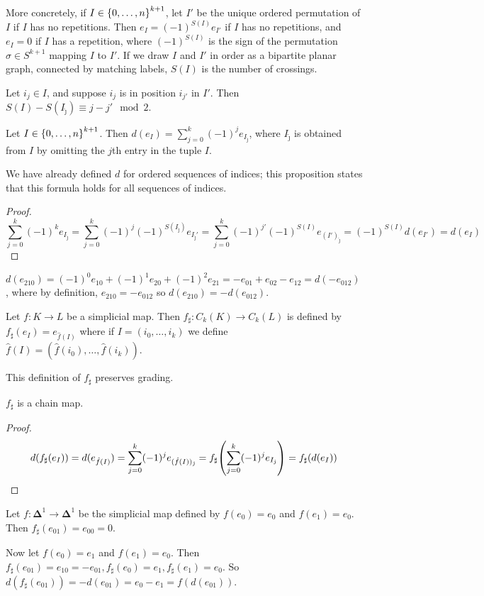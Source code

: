 More concretely, if \( I \in \qty{0, \dots, n}^{k+1} \), let \( I' \) be the unique ordered permutation of \( I \) if \( I \) has no repetitions.
Then \( e_I = (-1)^{S(I)} e_{I'} \) if \( I \) has no repetitions, and \( e_I = 0 \) if \( I \) has a repetition, where \( (-1)^{S(I)} \) is the sign of the permutation \( \sigma \in S^{k+1} \) mapping \( I \) to \( I' \).
If we draw \( I \) and \( I' \) in order as a bipartite planar graph, connected by matching labels, \( S(I) \) is the number of crossings.
\begin{lemma}
	Let \( i_j \in I \), and suppose \( i_j \) is in position \( i_{j'} \) in \( I' \).
	Then \( S(I) - S(I_{\hat\jmath}) \equiv j - j' \mod 2 \).
\end{lemma}
\begin{proposition}
	Let \( I \in \qty{0, \dots, n}^{k+1} \).
	Then \( d(e_I) = \sum_{j=0}^k (-1)^j e_{I_{\hat\jmath}} \), where \( I_{\hat\jmath} \) is obtained from \( I \) by omitting the \( j \)th entry in the tuple \( I \).
\end{proposition}
We have already defined \( d \) for ordered sequences of indices; this proposition states that this formula holds for all sequences of indices.
\begin{proof}
	\[ \sum_{j=0}^k (-1)^k e_{I_{\hat\jmath}} = \sum_{j=0}^k (-1)^j (-1)^{S(I_{\hat\jmath})} e_{I_{\hat\jmath}'} = \sum_{j=0}^k (-1)^{j'} (-1)^{S(I)} e_{(I')_{\hat\jmath}} = (-1)^{S(I)} d(e_{I'}) = d(e_I) \]
\end{proof}
\begin{example}
	\( d(e_{210}) = (-1)^0 e_{10} + (-1)^1 e_{20} + (-1)^2 e_{21} = -e_{01} + e_{02} - e_{12} = d(-e_{012}) \), where by definition, \( e_{210} = -e_{012} \) so \( d(e_{210}) = -d(e_{012}) \).
\end{example}
\begin{definition}
	Let \( f \colon K \to L \) be a simplicial map.
	Then \( f_\sharp \colon C_k(K) \to C_k(L) \) is defined by \( f_\sharp(e_I) = e_{\hat f(I)} \) where if \( I = (i_0, \dots, i_k) \) we define \( \hat f(I) = (\hat f(i_0), \dots, \hat f(i_k)) \).
\end{definition}
This definition of \( f_\sharp \) preserves grading.
\begin{proposition}
	\( f_\sharp \) is a chain map.
\end{proposition}
\begin{proof}
	\[ d(f_\sharp(e_I)) = d(e_{\hat f(I)}) = \sum_{j=0}^k (-1)^j e_{(\hat f(I))_{\hat \jmath}} = f_\sharp\qty(\sum_{j=0}^k (-1)^j e_{I_{\hat\jmath}}) = f_\sharp(d(e_I)) \]
\end{proof}
\begin{example}
	Let \( f \colon \bm\Delta^1 \to \bm\Delta^1 \) be the simplicial map defined by \( f(e_0) = e_0 \) and \( f(e_1) = e_0 \).
	Then \( f_\sharp(e_{01}) = e_{00} = 0 \).

	Now let \( f(e_0) = e_1 \) and \( f(e_1) = e_0 \).
	Then \( f_\sharp(e_{01}) = e_{10} = -e_{01}, f_\sharp(e_0) = e_1, f_\sharp(e_1) = e_0 \).
	So \( d(f_\sharp(e_{01})) = -d(e_{01}) = e_0 - e_1 = f(d(e_{01})) \).
\end{example}

